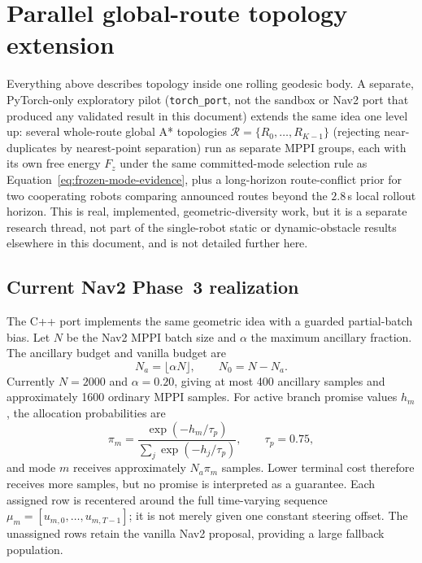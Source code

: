 \documentclass[11pt,a4paper]{article}
\begin{document}
\section{Parallel global-route topology extension}

Everything above describes topology inside one rolling geodesic body. A
separate, PyTorch-only exploratory pilot (\texttt{torch\_port}, not the
sandbox or Nav2 port that produced any validated result in this document)
extends the same idea one level up: several whole-route global A* topologies
$\mathcal R=\{R_0,\ldots,R_{K-1}\}$ (rejecting near-duplicates by
nearest-point separation) run as separate MPPI groups, each with its own
free energy $F_z$ under the same committed-mode selection rule as
Equation~\eqref{eq:frozen-mode-evidence}, plus a long-horizon route-conflict
prior for two cooperating robots comparing announced routes beyond the
$2.8\,$s local rollout horizon. This is real, implemented, geometric-diversity
work, but it is a separate research thread, not part of the single-robot
static or dynamic-obstacle results elsewhere in this document, and is not
detailed further here.

\subsection{Current Nav2 Phase~3 realization}

The C++ port implements the same geometric idea with a guarded partial-batch
bias. Let $N$ be the Nav2 MPPI batch size and $\alpha$ the maximum ancillary
fraction. The ancillary budget and vanilla budget are
\begin{equation}
  N_a=\lfloor\alpha N\rfloor,\qquad N_0=N-N_a.
\end{equation}
Currently $N=2000$ and $\alpha=0.20$, giving at most 400 ancillary samples and
approximately 1600 ordinary MPPI samples. For active branch promise values
$h_m$, the allocation probabilities are
\begin{equation}
  \pi_m=\frac{\exp(-h_m/\tau_p)}
              {\sum_j\exp(-h_j/\tau_p)},
  \qquad \tau_p=0.75,
\end{equation}
and mode $m$ receives approximately $N_a\pi_m$ samples. Lower terminal cost
therefore receives more samples, but no promise is interpreted as a guarantee.
Each assigned row is recentered around the full time-varying sequence
$\mu_m=[u_{m,0},\ldots,u_{m,T-1}]$; it is not merely given one constant steering
offset. The unassigned rows retain the vanilla Nav2 proposal, providing a
large fallback population.
\end{document}
